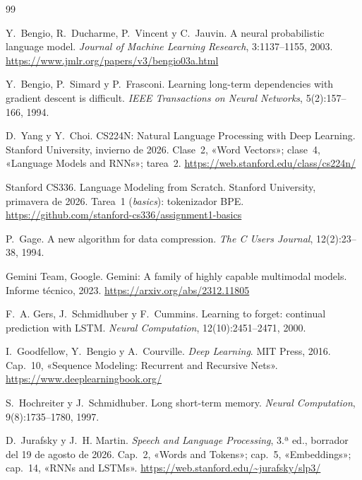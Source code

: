 \begin{thebibliography}{99}
\small

Y.~Bengio, R.~Ducharme, P.~Vincent y C.~Jauvin.
\newblock A neural probabilistic language model.
\newblock \emph{Journal of Machine Learning Research}, 3:1137--1155, 2003.
\newblock \url{https://www.jmlr.org/papers/v3/bengio03a.html}

Y.~Bengio, P.~Simard y P.~Frasconi.
\newblock Learning long-term dependencies with gradient descent is difficult.
\newblock \emph{IEEE Transactions on Neural Networks}, 5(2):157--166, 1994.

D.~Yang y Y.~Choi.
\newblock CS224N: Natural Language Processing with Deep Learning.
\newblock Stanford University, invierno de 2026. Clase~2, «Word Vectors»; clase~4, «Language Models and RNNs»; tarea~2.
\newblock \url{https://web.stanford.edu/class/cs224n/}

Stanford CS336.
\newblock Language Modeling from Scratch.
\newblock Stanford University, primavera de 2026. Tarea~1 (\emph{basics}): tokenizador BPE.
\newblock \url{https://github.com/stanford-cs336/assignment1-basics}

P.~Gage.
\newblock A new algorithm for data compression.
\newblock \emph{The C Users Journal}, 12(2):23--38, 1994.

Gemini Team, Google.
\newblock Gemini: A family of highly capable multimodal models.
\newblock Informe técnico, 2023.
\newblock \url{https://arxiv.org/abs/2312.11805}

F.~A. Gers, J.~Schmidhuber y F.~Cummins.
\newblock Learning to forget: continual prediction with LSTM.
\newblock \emph{Neural Computation}, 12(10):2451--2471, 2000.

I.~Goodfellow, Y.~Bengio y A.~Courville.
\newblock \emph{Deep Learning}.
\newblock MIT Press, 2016. Cap.~10, «Sequence Modeling: Recurrent and Recursive Nets».
\newblock \url{https://www.deeplearningbook.org/}

S.~Hochreiter y J.~Schmidhuber.
\newblock Long short-term memory.
\newblock \emph{Neural Computation}, 9(8):1735--1780, 1997.

D.~Jurafsky y J.~H. Martin.
\newblock \emph{Speech and Language Processing}, 3.ª ed., borrador del 19 de agosto de 2026.
\newblock Cap.~2, «Words and Tokens»; cap.~5, «Embeddings»; cap.~14, «RNNs and LSTMs».
\newblock \url{https://web.stanford.edu/~jurafsky/slp3/}


\end{thebibliography}
